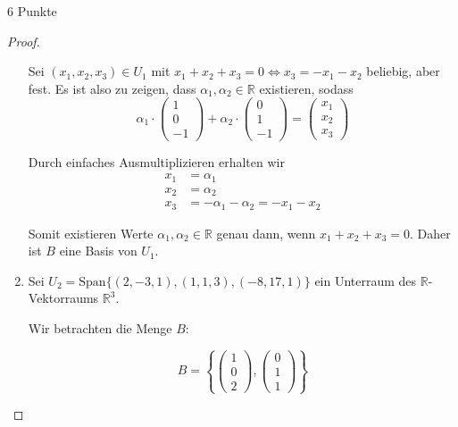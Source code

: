 \documentclass{problemset}
\begin{document}
\begin{problem}{6 Punkte}
\begin{proof}
\begin{enumerate}
              Sei $(x_1, x_2, x_3) \in U_1$ mit $x_1 + x_2 + x_3 = 0
              \Leftrightarrow x_3 = - x_1 - x_2$ beliebig, aber fest. Es ist
              also zu zeigen, dass $\alpha_1, \alpha_2 \in \mathbb{R}$
              existieren, sodass
              \[
                  \alpha_1 \cdot \begin{pmatrix}
                      1 \\
                      0 \\
                      -1
                  \end{pmatrix} + \alpha_2 \cdot \begin{pmatrix}
                      0 \\
                      1 \\
                      -1
                  \end{pmatrix} = \begin{pmatrix}
                      x_1 \\
                      x_2 \\
                      x_3
                  \end{pmatrix}
              \]

              Durch einfaches Ausmultiplizieren erhalten wir
              \begin{align*}
                  x_1 & = \alpha_1                                             \\
                  x_2 & = \alpha_2                                             \\
                  x_3 & = - \alpha_1 - \alpha_2 = - x_1 - x_2 \tag{\checkmark}
              \end{align*}

              Somit existieren Werte $\alpha_1, \alpha_2 \in \mathbb{R}$ genau
              dann, wenn $x_1 + x_2 + x_3 = 0$. Daher ist $B$ eine Basis von
              $U_1$.
        \item Sei $U_2 = \text{Span}\{(2, -3, 1), (1, 1, 3), (-8, 17, 1)\}$ ein
              Unterraum des $\mathbb{R}$-Vektorraums $\mathbb{R}^3$.

              Wir betrachten die Menge $B$:

              \[
                  B = \left\{
                  \begin{pmatrix}
                      1 \\ 0 \\ 2
                  \end{pmatrix},
                  \begin{pmatrix}
                      0 \\ 1 \\ 1
                  \end{pmatrix}
                  \right\}
              \]


\end{enumerate}
\end{proof}
\end{problem}
\end{document}
